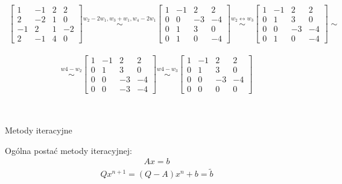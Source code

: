 \documentclass[12pt]{article}
\begin{document}
    \begin{align*}
        \begin{bmatrix}
            1 & -1 & 2 & 2\\
            2 & -2 & 1 & 0\\
            -1 & 2 & 1 & -2\\
            2 & -1 & 4 & 0
        \end{bmatrix}
        \stackrel{w_2 - 2w_1, w_3 + w_1, w_4 - 2w_1}{\sim}
        \begin{bmatrix}
            1 & -1 & 2 & 2\\
            0 & 0 & -3 & -4\\
            0 & 1 & 3 & 0\\
            0 & 1 & 0 & -4
        \end{bmatrix}
        \stackrel{w_2 \leftrightarrow w_3}{\sim}
        \begin{bmatrix}
            1 & -1 & 2 & 2\\
            0 & 1 & 3 & 0\\
            0 & 0 & -3 & -4\\
            0 & 1 & 0 & -4
        \end{bmatrix}
        \sim
    \end{align*}

    \begin{align*}
        \stackrel{w4 - w_2}{\sim}
        \begin{bmatrix}
            1 & -1 & 2 & 2\\
            0 & 1 & 3 & 0\\
            0 & 0 & -3 & -4\\
            0 & 0 & -3 & -4
        \end{bmatrix}
        \stackrel{w4 - w_3}{\sim}
        \begin{bmatrix}
            1 & -1 & 2 & 2\\
            0 & 1 & 3 & 0\\
            0 & 0 & -3 & -4\\
            0 & 0 & 0 & 0
        \end{bmatrix}
    \end{align*}

    \hfill \\
    \begin{center}{\large Metody iteracyjne}\end{center}
    Ogólna postać metody iteracyjnej:
    \begin{align*}
        Ax = b
    \end{align*}
    \begin{align*}
        Qx^{n+1} = (Q - A)x^n + b = \tilde{b}
    \end{align*}
\end{document}

